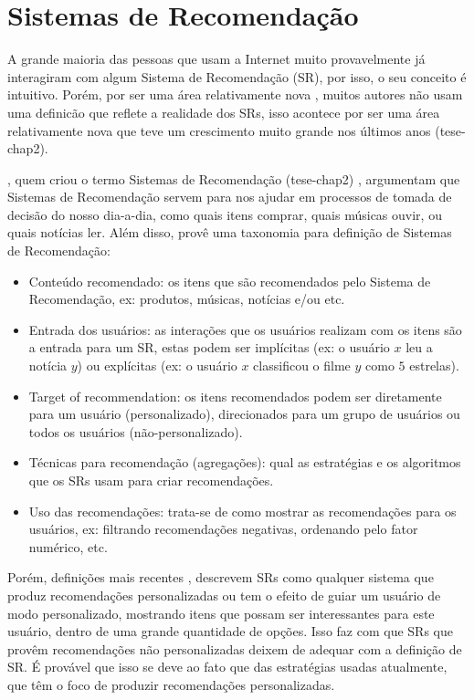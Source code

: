 \documentclass[normaltoc, espacoumemeio, pnumromarab,ruledheader]{abnt}
\begin{document}
\section{Sistemas de Recomendação}
\label{sec:sr}

A grande maioria das pessoas que usam a Internet muito provavelmente já interagiram com algum Sistema de Recomendação (SR), por isso, o seu conceito é intuitivo.
Porém, por ser uma área relativamente nova \cite{Lops2011}, muitos autores não usam uma definicão que reflete a realidade dos SRs, isso acontece por ser uma área relativamente nova que teve um crescimento muito grande nos últimos anos (tese-chap2).

, quem criou o termo Sistemas de Recomendação (tese-chap2) \cite{Neumann2007}, argumentam que Sistemas de Recomendação servem para nos ajudar em processos de tomada de decisão do nosso dia-a-dia, como quais itens comprar, quais músicas ouvir, ou quais notícias ler.
Além disso,  provê uma taxonomia para definição de Sistemas de Recomendação:
\begin{itemize}
  \item Conteúdo recomendado: os itens que são recomendados pelo Sistema de Recomendação, ex: produtos, músicas, notícias e/ou etc.
  \item Entrada dos usuários: as interações que os usuários realizam com os itens são a entrada para um SR, estas podem ser implícitas (ex: o usuário $x$ leu a notícia $y$) ou explícitas (ex: o usuário $x$ classificou o filme $y$ como $5$ estrelas).
  \item Target of recommendation: os itens recomendados podem ser diretamente para um usuário (personalizado), direcionados para um grupo de usuários ou todos os usuários (não-personalizado).
  \item Técnicas para recomendação (agregações): qual as estratégias e os algoritmos que os SRs usam para criar recomendações.
  \item Uso das recomendações: trata-se de como mostrar as recomendações para os usuários, ex: filtrando recomendações negativas, ordenando pelo fator numérico, etc.
\end{itemize}

Porém, definições mais recentes \cite{Burke2002,Burke2007}, descrevem SRs como qualquer sistema que produz recomendações personalizadas ou tem o efeito de guiar um usuário de modo personalizado, mostrando itens que possam ser interessantes para este usuário, dentro de uma grande quantidade de opções.
Isso faz com que SRs que provêm recomendações não personalizadas deixem de adequar com a definição de SR.
É provável que isso se deve ao fato que das estratégias usadas atualmente, que têm o foco de produzir recomendações personalizadas.
\end{document}
